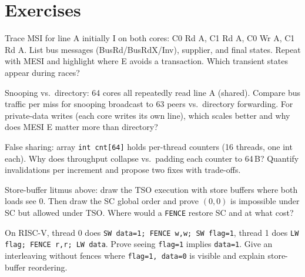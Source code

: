 \section{Exercises}
\begin{exercise}Trace MSI for line A initially I on both cores: C0 Rd A, C1 Rd A, C0 Wr A, C1 Rd A. List bus messages (BusRd/BusRdX/Inv), supplier, and final states. Repeat with MESI and highlight where E avoids a transaction. Which transient states appear during races?\end{exercise}
\begin{exercise}Snooping vs.\ directory: 64 cores all repeatedly read line A (shared). Compare bus traffic per miss for snooping broadcast to 63 peers vs.\ directory forwarding. For private-data writes (each core writes its own line), which scales better and why does MESI E matter more than directory?\end{exercise}
\begin{exercise}False sharing: array \texttt{int cnt[64]} holds per-thread counters (16 threads, one int each). Why does throughput collapse vs.\ padding each counter to 64\,B? Quantify invalidations per increment and propose two fixes with trade-offs.\end{exercise}
\begin{exercise}Store-buffer litmus above: draw the TSO execution with store buffers where both loads see 0. Then draw the SC global order and prove $(0,0)$ is impossible under SC but allowed under TSO. Where would a \texttt{FENCE} restore SC and at what cost?\end{exercise}
\begin{exercise}On RISC-V, thread 0 does \texttt{SW data=1; FENCE w,w; SW flag=1}, thread 1 does \texttt{LW flag; FENCE r,r; LW data}. Prove seeing \texttt{flag=1} implies \texttt{data=1}. Give an interleaving without fences where \texttt{flag=1, data=0} is visible and explain store-buffer reordering.\end{exercise}